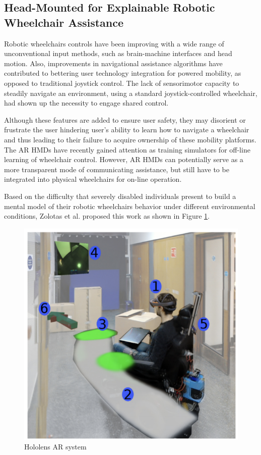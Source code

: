 \subsection{Head-Mounted for Explainable Robotic Wheelchair Assistance}

Robotic wheelchairs controls have been improving with a wide range of unconventional input methods, such as brain-machine interfaces and head motion. Also, improvements in navigational assistance algorithms have contributed to bettering user technology integration for powered mobility, as opposed to traditional joystick control. The lack of sensorimotor capacity to steadily navigate an environment, using a standard joystick-controlled wheelchair, had shown up the necessity to engage shared control.

Although these features are added to ensure user safety, they may disorient or frustrate the user hindering user’s ability to learn how to navigate a wheelchair and thus leading to their failure to acquire ownership of these mobility platforms. The AR HMDs have recently gained attention as training simulators for off-line learning of wheelchair control. However, AR HMDs can potentially serve as a more transparent mode of communicating assistance, but still have to be integrated into physical wheelchairs for on-line operation. 

Based on the difficulty that severely disabled individuals present to build a mental model of their robotic wheelchairs behavior under different environmental conditions, Zolotas et al. \cite{zolotas2018} proposed this work as shown in Figure \ref{fig:zolotas2018}.

\begin{figure}[!hbt]
\begin{center}
\includegraphics[width=0.7 \textwidth]{img/cap3/zolotas2018}
\caption{Hololens AR system \cite{zolotas2018}}
\label{fig:zolotas2018}
\end{center}
\end{figure}

